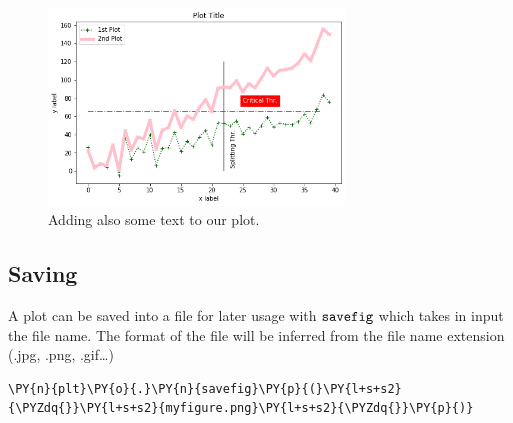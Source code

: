 \begin{figure}[htb]
	\centering
	\includegraphics[width=0.7\textwidth]{figures/text}
	\caption{Adding also some text to our plot.}
	\label{fig:text}
\end{figure}

\subsection{Saving}\label{saving}

A plot can be saved into a file for later usage with \(\tt{savefig}\)
which takes in input the file name. The format of the file will be
inferred from the file name extension (.jpg, .png, .gif\ldots)

\begin{tcolorbox}[breakable, size=fbox, boxrule=1pt, pad at break*=1mm,colback=cellbackground, colframe=cellborder]
\begin{Verbatim}[commandchars=\\\{\}]
\PY{n}{plt}\PY{o}{.}\PY{n}{savefig}\PY{p}{(}\PY{l+s+s2}{\PYZdq{}}\PY{l+s+s2}{myfigure.png}\PY{l+s+s2}{\PYZdq{}}\PY{p}{)}
\end{Verbatim}
\end{tcolorbox}

